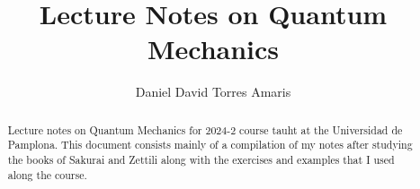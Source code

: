 \documentclass{article}
\title{Lecture Notes on Quantum Mechanics}
\author{Daniel David Torres Amaris}
\begin{document}
\begin{titlepage}
\thispagestyle{empty}
\maketitle

\begin{abstract}
Lecture notes on Quantum Mechanics for 2024-2 course tauht at the Universidad de Pamplona. This document consists mainly of a compilation of my notes after studying the books of Sakurai and Zettili along with the exercises and examples that I used along the course.
\end{abstract}

\tableofcontents
\end{titlepage}

\end{document}
